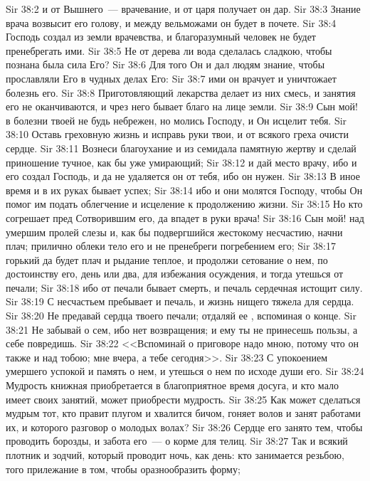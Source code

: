 \vs Sir 38:2 и от Вышнего~--- врачевание, и от царя получает он дар.
\vs Sir 38:3 Знание врача возвысит его голову, и между вельможами он будет в почете.
\vs Sir 38:4 Господь создал из земли врачевства, и благоразумный человек не будет пренебрегать ими.
\vs Sir 38:5 Не от дерева ли вода сделалась сладкою, чтобы познана была сила Его?
\vs Sir 38:6 Для того Он и дал людям знание, чтобы прославляли Его в чудных делах Его:
\vs Sir 38:7 ими он врачует  и уничтожает болезнь его.
\vs Sir 38:8 Приготовляющий лекарства делает из них смесь, и занятия его не оканчиваются, и чрез него бывает благо на лице земли.
\vs Sir 38:9 Сын мой! в болезни твоей не будь небрежен, но молись Господу, и Он исцелит тебя.
\vs Sir 38:10 Оставь греховную жизнь и исправь руки твои, и от всякого греха очисти сердце.
\vs Sir 38:11 Вознеси благоухание и из семидала памятную жертву и сделай приношение тучное, как бы уже умирающий;
\vs Sir 38:12 и дай место врачу, ибо и его создал Господь, и да не удаляется он от тебя, ибо он нужен.
\vs Sir 38:13 В иное время и в их руках бывает успех;
\vs Sir 38:14 ибо и они молятся Господу, чтобы Он помог им подать  облегчение и исцеление к продолжению жизни.
\vs Sir 38:15 Но кто согрешает пред Сотворившим его, да впадет в руки врача!
\vs Sir 38:16 Сын мой! над умершим пролей слезы и, как бы подвергшийся жестокому несчастию, начни плач; прилично облеки тело его и не пренебреги погребением его;
\vs Sir 38:17 горький да будет плач и рыдание теплое, и продолжи сетование о нем, по достоинству его, день или два, для избежания осуждения, и тогда утешься от печали;
\vs Sir 38:18 ибо от печали бывает смерть, и печаль сердечная истощит силу.
\vs Sir 38:19 С несчастьем пребывает и печаль, и жизнь нищего тяжела для сердца.
\vs Sir 38:20 Не предавай сердца твоего печали; отдаляй ее , вспоминая о конце.
\vs Sir 38:21 Не забывай о сем, ибо нет возвращения; и ему ты не принесешь пользы, а себе повредишь.
\vs Sir 38:22 <<Вспоминай о приговоре надо мною, потому что он также и над тобою; мне вчера, а тебе сегодня>>.
\vs Sir 38:23 С упокоением умершего успокой и память о нем, и утешься о нем по исходе души его.
\rsbpar\vs Sir 38:24 Мудрость книжная приобретается в благоприятное время досуга, и кто мало имеет своих занятий, может приобрести мудрость.
\vs Sir 38:25 Как может сделаться мудрым тот, кто правит плугом и хвалится бичом, гоняет волов и занят работами их, и которого разговор  о молодых волах?
\vs Sir 38:26 Сердце его занято тем, чтобы проводить борозды, и забота его~--- о корме для телиц.
\vs Sir 38:27 Так и всякий плотник и зодчий, который проводит ночь, как день: кто занимается резьбою, того прилежание в том, чтобы оразнообразить форму;
